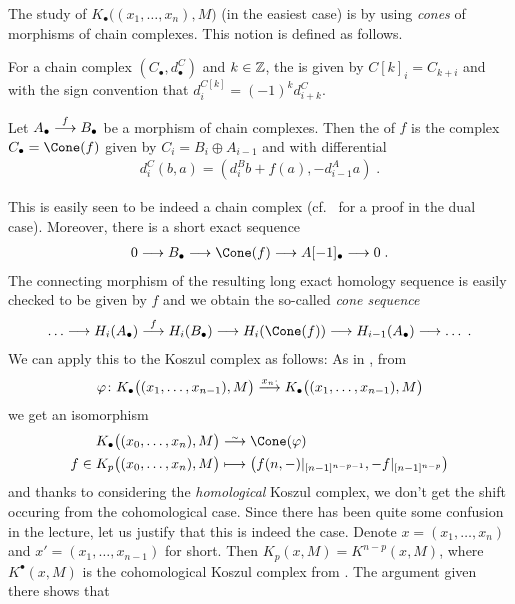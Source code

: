 \documentclass[a4paper,parskip=half,numbers=enddot, DIV=12]{scrreprt}
\begin{document}
The study of $K_\bullet\big((x_1,\ldots,x_n),M\big)$ (in the easiest case) is by using \emph{cones} of morphisms of chain complexes. This notion is defined as follows.
\begin{defi}
	\begin{alphanumerate}
		\item For a chain complex $(C_\bullet,d_\bullet^C)$ and $k\in \mathbb{Z}$, the  is given by $C[k]_i=C_{k+i}$ and with the sign convention that $d_i^{C[k]}=(-1)^kd_{i+k}^C$.
		\item Let $A_\bullet\morphism[f]B_\bullet$ be a morphism of chain complexes. Then the   of $f$ is the complex $C_\bullet=\Cone(f)$ given by $C_i=B_i\oplus A_{i-1}$ and with differential 
		\begin{align*}
			d_i^C(b,a)=(d_i^Bb+f(a), -d_{i-1}^Aa)\;.
		\end{align*}
	\end{alphanumerate}
\end{defi}
 This is easily seen to be indeed a chain complex (cf.\ \cite[Remark~2.1.1]{alggeo2} for a proof in the dual case). Moreover, there is a short exact sequence
\begin{align}\lbl{eq:ConeSeq}
	0\morphism B_\bullet\morphism \Cone(f)\morphism A[-1]_\bullet\morphism 0\;.
\end{align}
The connecting morphism of the resulting long exact homology sequence is easily checked to be given by $f$ and we obtain the so-called \emph{cone sequence}
\begin{align*}
	\ldots\morphism H_i(A_\bullet)\morphism[f] H_i(B_\bullet)\morphism H_i(\Cone(f))\morphism H_{i-1}(A_\bullet)\morphism\ldots\;.
\end{align*}
We can apply this to the Koszul complex as follows: As in \cite[Remark~2.1.3]{alggeo2}, from
\begin{align*}
	\phi\colon K_\bullet\big((x_1,\ldots,x_{n-1}),M\big)\morphism[x_n\cdot]K_\bullet\big((x_1,\ldots,x_{n-1}),M\big)
\end{align*}
we get an isomorphism
\begin{align}\lbl{eq:KoszulCone}
	\begin{split}
		K_\bullet\big((x_0,\ldots,x_n),M\big)&\isomorphism\Cone(\phi)\\
		f\in K_p\big((x_0,\ldots,x_n),M\big)&\longmapsto \left(f(n,-)|_{[n-1]^{n-p-1}}, -f|_{[n-1]^{n-p}}\right)
	\end{split}			
\end{align}
and thanks to considering the \emph{homological} Koszul complex, we don't get the shift occuring from the cohomological case. Since there has been quite some confusion in the lecture, let us justify that this is indeed the case. Denote $x=(x_1,\ldots,x_n)$ and $x'=(x_1,\ldots,x_{n-1})$ for short. Then $K_p(x,M)=K^{n-p}(x,M)$, where $K^\bullet(x,M)$ is the cohomological Koszul complex from \cite[Definition~2.1.3]{alggeo2}. The argument given there shows that
\end{document}
